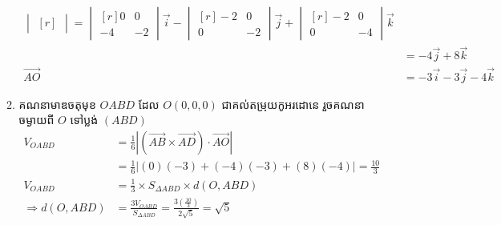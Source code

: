 \documentclass[11pt,a4paper]{myclass}
\begin{document}
\begin{enumerate}
\begin{enumerate}
\begin{align*}
\begin{vmatrix*}[r]
			\end{vmatrix*}
			=\begin{vmatrix*}[r]
			0 & 0\\
			-4 & -2
			\end{vmatrix*}\vec{i}
			-\begin{vmatrix*}[r]
			-2& 0\\
			0 & -2
			\end{vmatrix*}\vec{j}
			+\begin{vmatrix*}[r]
			-2 & 0\\
			0 & -4 
			\end{vmatrix*}\vec{k}\\
			&=-4\vec{j}+8\vec{k}\\
			\overrightarrow{AO} &=-3\vec{i}-3\vec{j}-4\vec{k}
			\end{align*}
			\item គណនាមាឌចតុមុខ $ OABD $ ដែល $ O(0,0,0) $ ជាគល់តម្រុយកូអរដោនេ រួចគណនាចម្ងាយពី $ O $ ទៅប្លង់ $ (ABD) $
			\begin{align*}
			V_{OABD} &=\frac{1}{6}\left| (\overrightarrow{AB}\times \overrightarrow{AD})\cdot \overrightarrow{AO} \right|\\
			&=\frac{1}{6}\left| (0)(-3)+(-4)(-3)+(8)(-4) \right|=\frac{10}{3}\\
			V_{OABD} &=\frac{1}{3}\times S_{\Delta ABD}\times d(O,ABD)\\
			\Rightarrow
			d(O,ABD) &=\frac{3V_{OABD}}{S_{\Delta ABD}}
			=\frac{3\left( \frac{10}{3} \right)}{2\sqrt{5}}
			=\sqrt{5}
			\end{align*}
		\end{enumerate}
	\end{enumerate}
\end{document}
